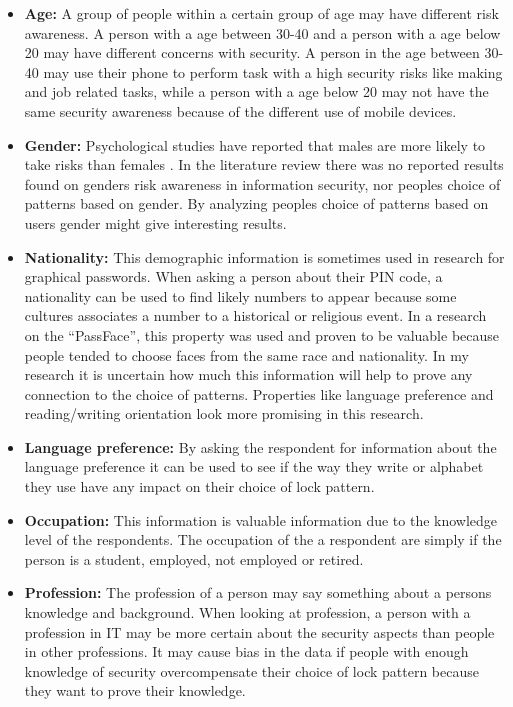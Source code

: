     \begin{itemize}
      \item {\bf Age:} A group of people within a certain group of age may have different risk awareness. A person with a age between 30-40 and a person with a age below 20 may have different concerns with security. A person in the age between 30-40 may use their phone to perform task with a high security risks like making and job related tasks, while a person with a age below 20 may not have the same security awareness because of the different use of mobile devices.
      \item {\bf Gender:} Psychological studies have reported that males are more likely to take risks than females \cite{Byrnes}. In the literature review there was no reported results found on genders risk awareness in information security, nor peoples choice of patterns based on gender. By analyzing peoples choice of patterns based on users gender might give interesting results. 
      \item {\bf Nationality:} This demographic information is sometimes used in research for graphical passwords. When asking a person about their PIN code, a nationality can be used to find likely numbers to appear because some cultures associates a number to a historical or religious event. In a research on the ``PassFace'', this property was used and proven to be valuable because people tended to choose faces from the same race and nationality. In my research it is uncertain how much this information will help to prove any connection to the choice of patterns. Properties like language preference and reading/writing orientation look more promising in this research.
      \item {\bf Language preference:} By asking the respondent for information about the language preference it can be used to see if the way they write or alphabet they use have any impact on their choice of lock pattern.
      \item{\bf Occupation:} This information is valuable information due to the knowledge level of the respondents. The occupation of the a respondent are simply if the person is a student, employed, not employed or retired.
      \item {\bf Profession:} The profession of a person may say something about a persons knowledge and background. When looking at profession, a person with a profession in IT may be more certain about the security aspects than people in other professions. It may cause bias in the data if people with enough knowledge of security overcompensate their choice of lock pattern because they want to prove their knowledge.  

\end{itemize}
